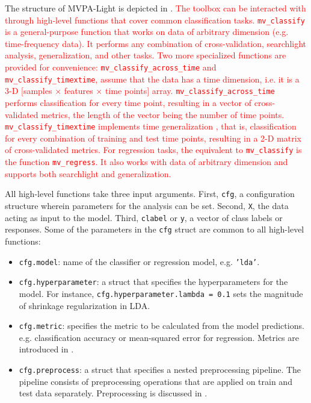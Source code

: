 \documentclass[utf8]{frontiersSCNS} %
\newcommand{\ttt}[1]{\texttt{#1}}
\newcommand{\red}[1]{\textcolor{red}{#1}}
\begin{document}
The structure of MVPA-Light is depicted in . \red{The toolbox can be interacted with through high-level functions that cover common classification tasks. \ttt{mv\_classify} is a  general-purpose function that works on data of arbitrary dimension (e.g. time-frequency data). It performs any combination of cross-validation, searchlight analysis, generalization, and other tasks. Two more specialized functions are provided for convenience: \ttt{mv\_classify\_across\_time}  and \ttt{mv\_classify\_timextime}, assume that the data has a time dimension, i.e. it is a 3-D [samples $\times$ features $\times$ time points] array. \ttt{mv\_classify\_across\_time} performs classification for every time point, resulting in a vector of cross-validated metrics, the length of the vector being the number of time points. \ttt{mv\_classify\_timextime} implements time generalization \citep{King2014}, that is, classification for every combination of training and test time points, resulting in a 2-D matrix of cross-validated metrics. For regression tasks, the equivalent to \ttt{mv\_classify} is the function \ttt{mv\_regress}. It also works with data of arbitrary dimension and supports both searchlight and generalization.}

All high-level functions take three input arguments. First, \ttt{cfg}, a configuration structure wherein parameters for the analysis can be set. Second, \ttt{X}, the data acting as input to the model. Third, \ttt{clabel} or \ttt{y}, a vector of class labels or responses. Some of the parameters in the \ttt{cfg} struct are common  to all high-level functions:

\begin{itemize}
    \item \ttt{cfg.model}: name of the classifier or regression model, e.g. \ttt{'lda'}.
    \item \ttt{cfg.hyperparameter}: a struct that specifies the hyperparameters for the model. For instance, \ttt{cfg.hyperparameter.lambda = 0.1} sets the magnitude of shrinkage regularization in LDA.
    \item \ttt{cfg.metric}: specifies the metric to be calculated from the model predictions. e.g. classification accuracy or mean-squared error for regression. Metrics are introduced in .
    \item \ttt{cfg.preprocess}: a struct that specifies a nested preprocessing pipeline. The pipeline consists of preprocessing operations that are applied on train and test data separately. Preprocessing is discussed in .
\end{itemize}
\end{document}
